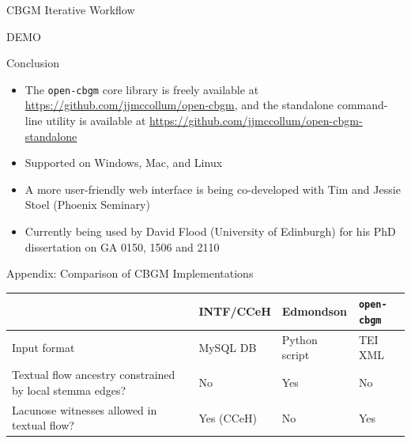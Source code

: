 \documentclass[10pt]{beamer}
\begin{document}
	\begin{frame}{CBGM Iterative Workflow}
		\begin{center}
			DEMO
		\end{center}
	\end{frame}
	\begin{frame}{Conclusion}
		\begin{itemize}
			\item The \texttt{open-cbgm} core library is freely available at \url{https://github.com/jjmccollum/open-cbgm}, and the standalone command-line utility is available at \url{https://github.com/jjmccollum/open-cbgm-standalone}
			\item Supported on Windows, Mac, and Linux
			\item A more user-friendly web interface is being co-developed with Tim and Jessie Stoel (Phoenix Seminary)
			\item Currently being used by David Flood (University of Edinburgh) for his PhD dissertation on GA 0150, 1506 and 2110
		\end{itemize}
	\end{frame}
	\begin{frame}[allowframebreaks]
		\printbibliography
	\end{frame}
	\begin{frame}{Appendix: Comparison of CBGM Implementations}
		\begin{table}
			\centering
			\begin{tabular}{p{6em}p{6em}p{6em}p{4em}}
				 & \phantom{text}\newline INTF/CCeH & \phantom{text}\newline Edmondson & \texttt{open-}\newline\texttt{cbgm}\\
				\hline
				\hline
				Input format & MySQL DB & Python script & TEI XML\\
				\hline
				Textual flow ancestry constrained by local stemma edges? & No & Yes & No\\
				\hline
				Lacunose witnesses allowed in textual flow? & Yes (CCeH) & No & Yes
			\end{tabular}
		\end{table}
	\end{frame}
\end{document}
